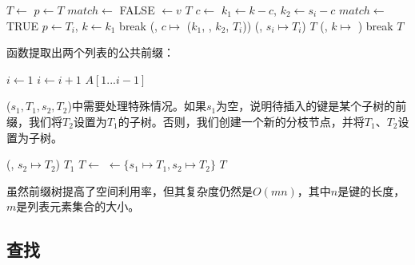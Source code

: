 \documentclass[b5paper]{ctexart}
\begin{document}
\begin{algorithmic}[1]
   \State $T \gets$ 
  \EndIf
  \State $p \gets T$
  \Loop
    \State $match \gets$ FALSE
        \State {} $\gets v$ 
        \State \Return $T$
      \EndIf
      \State $c \gets$ 
      \State $k_1 \gets k - c$, $k_2 \gets s_i - c$
        \State $match \gets$ TRUE
         
          \State $p \gets T_i$, $k \gets k_1$
          \State break
        \Else {}
          \State {}(, $c \mapsto$ ($k_1$, , $k_2$, $T_i$))
          \State {}(, $s_i \mapsto T_i$)
          \State \Return $T$
        \EndIf
      \EndIf
    \EndFor
     
      \State {}(, $k \mapsto$ )
      \State break
    \EndIf
  \EndLoop
  \State \Return $T$
\EndFunction
\end{algorithmic}

函数提取出两个列表的公共前缀：

\begin{algorithmic}[1]
  \State $i \gets 1 $
    \State $i \gets i + 1$
  \EndWhile
  \State \Return $A[1...i-1]$
\EndFunction
\end{algorithmic}

($s_1, T_1, s_2, T_2$)中需要处理特殊情况。如果$s_1$为空，说明待插入的键是某个子树的前缀，我们将$T_2$设置为$T_1$的子树。否则，我们创建一个新的分枝节点，并将$T_1$、$T_2$设置为子树。

\begin{algorithmic}[1]
    \State {}(, $s_2 \mapsto T_2$)
    \State \Return $T_1$
  \EndIf
  \State $T \gets$ 
  \State {} $\gets \{s_1 \mapsto T_1, s_2 \mapsto T_2\}$
  \State \Return $T$
\EndFunction
\end{algorithmic}

虽然前缀树提高了空间利用率，但其复杂度仍然是$O(mn)$，其中$n$是键的长度，$m$是列表元素集合的大小。

\subsection{查找}
\end{document}
